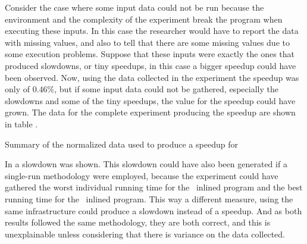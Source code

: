Consider the case where some input data could not be run because the environment and the complexity of the experiment break the program when executing these inputs. In this case the researcher would have to report the data with missing values, and also to tell that there are some missing values due to some execution problems. Suppose that these inputs were exactly the ones that produced slowdowns, or tiny speedups, in this case a bigger speedup could have been observed. Now, using the data collected in the experiment the speedup was only of $0.46 \%$, but if some input data could not be gathered, especially the slowdowns and some of the tiny speedups, the value for the speedup could have grown. The data for the complete experiment producing the speedup are shown in table .

\begin{table}
  \centering
  \begin{tiny}
  
  \end{tiny}
  \caption{Summary of the normalized data used to produce a speedup for \bzip}
  \label{tab:fullexp}
\end{table}

In  a slowdown was shown. This slowdown could have also been generated if a single-run methodology were employed, because the experiment could have gathered the worst individual running time for the \FDI\ inlined program and the best running time for the \llvm\ inlined program. This way a different measure, using the same infrastructure could produce a slowdown instead of a speedup. And as both results followed the same methodology, they are both correct, and this is unexplainable unless considering that there is variance on the data collected.

